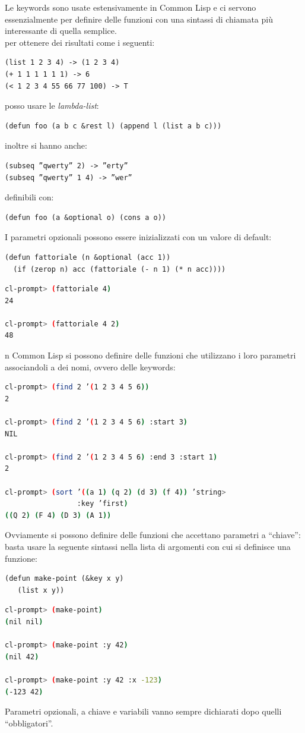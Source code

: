 \documentclass[a4paper,12pt, oneside]{book}
\begin{document}
Le keywords sono usate estensivamente in Common Lisp e ci
servono essenzialmente per definire delle funzioni con una
sintassi di chiamata più interessante di quella semplice.\\
per ottenere dei risultati come i seguenti:
\begin{verbatim}
(list 1 2 3 4) -> (1 2 3 4)
(+ 1 1 1 1 1 1) -> 6
(< 1 2 3 4 55 66 77 100) -> T
\end{verbatim}
posso usare le \textit{lambda-list}:
\begin{verbatim}
(defun foo (a b c &rest l) (append l (list a b c)))
\end{verbatim}
inoltre si hanno anche:
\begin{verbatim}
(subseq ”qwerty” 2) -> ”erty”
(subseq ”qwerty” 1 4) -> ”wer”
\end{verbatim}
definibili con:
\begin{verbatim}
(defun foo (a &optional o) (cons a o))
\end{verbatim}
I parametri opzionali possono essere inizializzati con un valore di default:
\begin{verbatim}
(defun fattoriale (n &optional (acc 1))
  (if (zerop n) acc (fattoriale (- n 1) (* n acc))))
\end{verbatim}
\begin{shaded}
\begin{lstlisting}[language=bash]
cl-prompt> (fattoriale 4)
24

cl-prompt> (fattoriale 4 2)
48
\end{lstlisting}
\end{shaded}
n Common Lisp si possono definire delle funzioni che utilizzano i loro parametri
associandoli a dei nomi, ovvero delle keywords:
\begin{shaded}
\begin{lstlisting}[language=bash]
cl-prompt> (find 2 ’(1 2 3 4 5 6))
2

cl-prompt> (find 2 ’(1 2 3 4 5 6) :start 3)
NIL

cl-prompt> (find 2 ’(1 2 3 4 5 6) :end 3 :start 1)
2

cl-prompt> (sort ’((a 1) (q 2) (d 3) (f 4)) ’string>
                 :key ’first)
((Q 2) (F 4) (D 3) (A 1))
\end{lstlisting}
\end{shaded}
Ovviamente si possono definire delle funzioni che accettano parametri a “chiave”: basta usare la seguente
sintassi nella lista di argomenti con cui si definisce una funzione:
\begin{verbatim}
(defun make-point (&key x y)
   (list x y))
\end{verbatim}
\begin{shaded}
\begin{lstlisting}[language=bash]
cl-prompt> (make-point)
(nil nil)

cl-prompt> (make-point :y 42)
(nil 42)

cl-prompt> (make-point :y 42 :x -123)
(-123 42)
\end{lstlisting}
\end{shaded}
Parametri opzionali, a chiave e variabili vanno sempre dichiarati dopo quelli “obbligatori”.\\
\end{document}
